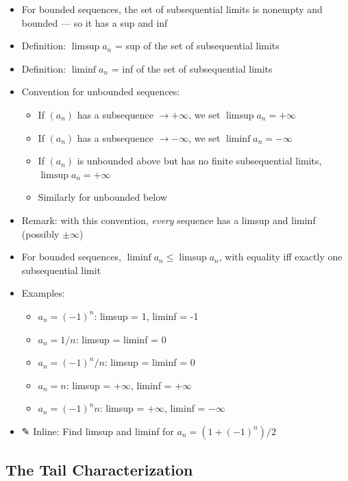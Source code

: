 \documentclass[
  10pt,
  letterpaper,
]{scrbook}
\providecommand{\tightlist}{%
  \setlength{\itemsep}{0pt}\setlength{\parskip}{0pt}}
\begin{document}
\begin{itemize}
\tightlist
\item
  For bounded sequences, the set of subsequential limits is nonempty and
  bounded --- so it has a sup and inf
\item
  Definition: \(\limsup a_n\) = sup of the set of subsequential limits
\item
  Definition: \(\liminf a_n\) = inf of the set of subsequential limits
\item
  Convention for unbounded sequences:

  \begin{itemize}
  \tightlist
  \item
    If \((a_n)\) has a subsequence \(\to +\infty\), we set
    \(\limsup a_n = +\infty\)
  \item
    If \((a_n)\) has a subsequence \(\to -\infty\), we set
    \(\liminf a_n = -\infty\)
  \item
    If \((a_n)\) is unbounded above but has no finite subsequential
    limits, \(\limsup a_n = +\infty\)
  \item
    Similarly for unbounded below
  \end{itemize}
\item
  Remark: with this convention, \emph{every} sequence has a limsup and
  liminf (possibly \(\pm\infty\))
\item
  For bounded sequences, \(\liminf a_n \leq \limsup a_n\), with equality
  iff exactly one subsequential limit
\item
  Examples:

  \begin{itemize}
  \tightlist
  \item
    \(a_n = (-1)^n\): limsup = 1, liminf = -1
  \item
    \(a_n = 1/n\): limsup = liminf = 0
  \item
    \(a_n = (-1)^n/n\): limsup = liminf = 0
  \item
    \(a_n = n\): limsup = \(+\infty\), liminf = \(+\infty\)
  \item
    \(a_n = (-1)^n n\): limsup = \(+\infty\), liminf = \(-\infty\)
  \end{itemize}
\item
  ✎ Inline: Find limsup and liminf for \(a_n = (1 + (-1)^n)/2\)
\end{itemize}

\subsection{The Tail Characterization}\label{the-tail-characterization}
\end{document}
